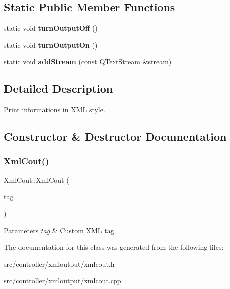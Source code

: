 \subsection*{Static Public Member Functions}
\begin{DoxyCompactItemize}
\item 
\mbox{\label{classXmlCout_a7b2d4d3c48fd7f0146ec3928601b9184}} 
static void {\bfseries turn\+Output\+Off} ()
\item 
\mbox{\label{classXmlCout_a14950efe4decb1cad75b5143e8df3f71}} 
static void {\bfseries turn\+Output\+On} ()
\item 
\mbox{\label{classXmlCout_ada04e1d6c2fba11a77d8760b8e542922}} 
static void {\bfseries add\+Stream} (const Q\+Text\+Stream \&stream)
\end{DoxyCompactItemize}


\subsection{Detailed Description}
Print informations in X\+ML style. 

\subsection{Constructor \& Destructor Documentation}
\mbox{\label{classXmlCout_ae895068dd12946b6b57ef1a70b9f0d7a}} 
\subsubsection{\texorpdfstring{Xml\+Cout()}{XmlCout()}}
{\footnotesize\ttfamily Xml\+Cout\+::\+Xml\+Cout (\begin{DoxyParamCaption}\item[{const Q\+String \&}]{tag }\end{DoxyParamCaption})\hspace{0.3cm}{\ttfamily [explicit]}}


\begin{DoxyParams}{Parameters}
{\em tag} & Custom X\+ML tag. \\
\hline
\end{DoxyParams}


The documentation for this class was generated from the following files\+:\begin{DoxyCompactItemize}
\item 
src/controller/xmloutput/xmlcout.\+h\item 
src/controller/xmloutput/xmlcout.\+cpp\end{DoxyCompactItemize}
